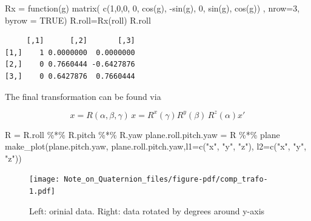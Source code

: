 \documentclass[
  letterpaper,
  DIV=11,
  numbers=noendperiod]{scrartcl}
\newenvironment{Shaded}{\begin{snugshade}}{\end{snugshade}}
\newcommand{\AttributeTok}[1]{\textcolor[rgb]{0.40,0.45,0.13}{#1}}
\newcommand{\ConstantTok}[1]{\textcolor[rgb]{0.56,0.35,0.01}{#1}}
\newcommand{\ControlFlowTok}[1]{\textcolor[rgb]{0.00,0.23,0.31}{#1}}
\newcommand{\DecValTok}[1]{\textcolor[rgb]{0.68,0.00,0.00}{#1}}
\newcommand{\FunctionTok}[1]{\textcolor[rgb]{0.28,0.35,0.67}{#1}}
\newcommand{\NormalTok}[1]{\textcolor[rgb]{0.00,0.23,0.31}{#1}}
\newcommand{\OtherTok}[1]{\textcolor[rgb]{0.00,0.23,0.31}{#1}}
\newcommand{\SpecialCharTok}[1]{\textcolor[rgb]{0.37,0.37,0.37}{#1}}
\newcommand{\StringTok}[1]{\textcolor[rgb]{0.13,0.47,0.30}{#1}}
\begin{document}
\begin{Shaded}
\begin{Highlighting}[]
\NormalTok{Rx }\OtherTok{=} \ControlFlowTok{function}\NormalTok{(g) }\FunctionTok{matrix}\NormalTok{(}
      \FunctionTok{c}\NormalTok{(}\DecValTok{1}\NormalTok{,}\DecValTok{0}\NormalTok{,}\DecValTok{0}\NormalTok{, }\DecValTok{0}\NormalTok{, }\FunctionTok{cos}\NormalTok{(g), }\SpecialCharTok{{-}}\FunctionTok{sin}\NormalTok{(g), }\DecValTok{0}\NormalTok{, }\FunctionTok{sin}\NormalTok{(g), }\FunctionTok{cos}\NormalTok{(g))}
\NormalTok{      , }\AttributeTok{nrow=}\DecValTok{3}\NormalTok{, }\AttributeTok{byrow =} \ConstantTok{TRUE}\NormalTok{) }
\NormalTok{R.roll}\OtherTok{=}\FunctionTok{Rx}\NormalTok{(roll)}
\NormalTok{R.roll}
\end{Highlighting}
\end{Shaded}

\begin{verbatim}
     [,1]      [,2]       [,3]
[1,]    1 0.0000000  0.0000000
[2,]    0 0.7660444 -0.6427876
[3,]    0 0.6427876  0.7660444
\end{verbatim}

\hfill\break
The final transformation can be found via

\[
x=R(\alpha, \beta, \gamma)\,x= R^{x}(\gamma) R^{y}(\beta)\,R^z(\alpha)x'
\]

\begin{Shaded}
\begin{Highlighting}[]
\NormalTok{R }\OtherTok{=}\NormalTok{ R.roll }\SpecialCharTok{\%*\%}\NormalTok{ R.pitch }\SpecialCharTok{\%*\%}\NormalTok{ R.yaw}
\NormalTok{plane.roll.pitch.yaw }\OtherTok{=}\NormalTok{ R }\SpecialCharTok{\%*\%}\NormalTok{ plane }
\FunctionTok{make\_plot}\NormalTok{(plane.pitch.yaw, plane.roll.pitch.yaw,}\AttributeTok{l1=}\FunctionTok{c}\NormalTok{(}\StringTok{"x\textquotesingle{}\textquotesingle{}"}\NormalTok{, }\StringTok{"y\textquotesingle{}\textquotesingle{}"}\NormalTok{, }\StringTok{"z\textquotesingle{}\textquotesingle{}"}\NormalTok{), }\AttributeTok{l2=}\FunctionTok{c}\NormalTok{(}\StringTok{"x\textquotesingle{}\textquotesingle{}\textquotesingle{}"}\NormalTok{, }\StringTok{"y\textquotesingle{}\textquotesingle{}\textquotesingle{}"}\NormalTok{, }\StringTok{"z\textquotesingle{}\textquotesingle{}\textquotesingle{}"}\NormalTok{)) }
\end{Highlighting}
\end{Shaded}

\begin{figure}[H]

{\centering \texttt{[image: Note\_on\_Quaternion\_files/figure-pdf/comp\_trafo-1.pdf]}

}

\caption{Left: orinial data. Right: data rotated by degrees around
y-axis}

\end{figure}
\end{document}
